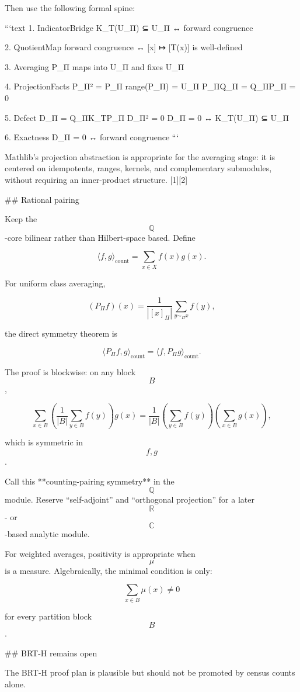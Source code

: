 Then use the following formal spine:

```text
1. IndicatorBridge
   K_T(U_Π) ⊆ U_Π ↔ forward congruence

2. QuotientMap
   forward congruence ↔ [x] ↦ [T(x)] is well-defined

3. Averaging
   P_Π maps into U_Π and fixes U_Π

4. ProjectionFacts
   P_Π² = P_Π
   range(P_Π) = U_Π
   P_ΠQ_Π = Q_ΠP_Π = 0

5. Defect
   D_Π = Q_ΠK_TP_Π
   D_Π² = 0
   D_Π = 0 ↔ K_T(U_Π) ⊆ U_Π

6. Exactness
   D_Π = 0 ↔ forward congruence
```

Mathlib’s projection abstraction is appropriate for the averaging stage: it is centered on idempotents, ranges, kernels, and complementary submodules, without requiring an inner-product structure. [1][2]

## Rational pairing

Keep the $$\mathbb Q$$-core bilinear rather than Hilbert-space based. Define

$$
\langle f,g\rangle_{\mathrm{count}}
=
\sum_{x\in X}f(x)g(x).
$$

For uniform class averaging,

$$
(P_\Pi f)(x)
=
\frac{1}{|[x]_\Pi|}
\sum_{y\sim_\Pi x}f(y),
$$

the direct symmetry theorem is

$$
\langle P_\Pi f,g\rangle_{\mathrm{count}}
=
\langle f,P_\Pi g\rangle_{\mathrm{count}}.
$$

The proof is blockwise: on any block $$B$$,

$$
\sum_{x\in B}
\left(\frac{1}{|B|}\sum_{y\in B}f(y)\right)g(x)
=
\frac{1}{|B|}
\left(\sum_{y\in B}f(y)\right)
\left(\sum_{x\in B}g(x)\right),
$$

which is symmetric in $$f,g$$.

Call this **counting-pairing symmetry** in the $$\mathbb Q$$ module. Reserve “self-adjoint” and “orthogonal projection” for a later $$\mathbb R$$- or $$\mathbb C$$-based analytic module.

For weighted averages, positivity is appropriate when $$\mu$$ is a measure. Algebraically, the minimal condition is only:

$$
\sum_{x\in B}\mu(x)\neq0
$$

for every partition block $$B$$.

## BRT-H remains open

The BRT-H proof plan is plausible but should not be promoted by census counts alone.

